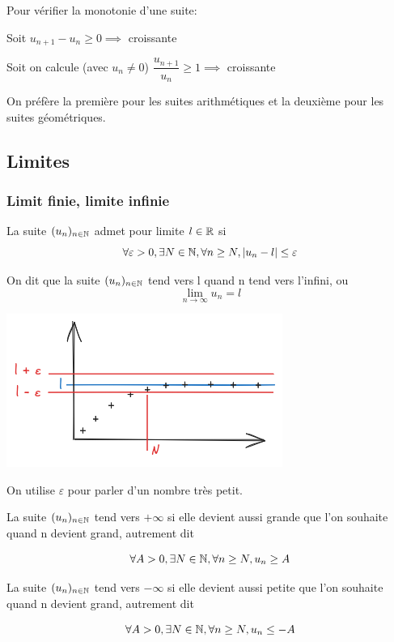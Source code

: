 \documentclass[a4paper, 12pt]{article}
\begin{document}
\begin{remark}
    Pour vérifier la monotonie d'une suite:

    \item Soit $u_{n+1} - u_n \geq 0 \implies$ croissante
    \item Soit on calcule (avec $u_n \neq 0$) $\dfrac{u_{n+1}}{u_n} \geq 1 \implies$ croissante

    On préfère la première pour les suites arithmétiques et la deuxième pour les suites géométriques.
\end{remark}

\subsection{Limites}

\subsubsection{Limit finie, limite infinie}

\begin{definition}
    La suite $(u_n)_{n \in \mathbb{N}}$ admet pour limite $l \in \mathbb{R}$ si
    $$
    \forall \varepsilon > 0, \exists N \in \mathbb{N}, \forall n \geq N, |u_n - l| \leq \varepsilon
    $$

    On dit que la suite $(u_n)_{n \in \mathbb{N}}$ tend vers l quand n tend vers l'infini, ou
    $$
    \lim_{n \to \infty} u_n = l
    $$
\end{definition}

\includegraphics{../images/limite.png}

\begin{remark}
    On utilise $\varepsilon$ pour parler d'un nombre très petit.
\end{remark}

\begin{definition}
    La suite $(u_n)_{n \in \mathbb{N}}$ tend vers $+\infty$ si elle devient aussi grande que l'on souhaite quand n
    devient grand, autrement dit

    $$
    \forall A > 0, \exists N \in \mathbb{N}, \forall n \geq N, u_n \geq A
    $$

    La suite $(u_n)_{n \in \mathbb{N}}$ tend vers $-\infty$ si elle devient aussi petite que l'on souhaite quand n
    devient grand, autrement dit

    $$
    \forall A > 0, \exists N \in \mathbb{N}, \forall n \geq N, u_n \leq -A
    $$
\end{definition}
\end{document}

